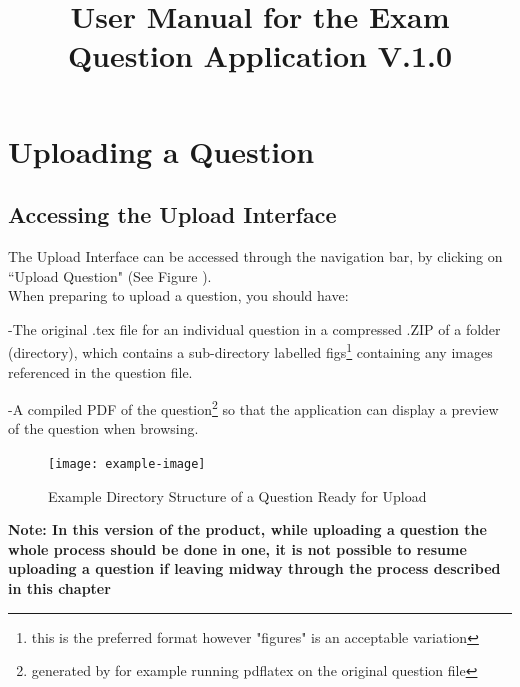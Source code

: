 \documentclass[12pt, a4paper, titlepage]{book}
\begin{document}
\begin{titlepage}

\title{User Manual for the Exam Question Application V.1.0}
\maketitle
\end{titlepage}
\tableofcontents

\chapter{Uploading a Question}
\section{Accessing the Upload Interface}
The Upload Interface can be accessed through the navigation bar, by clicking on ``Upload Question" (See Figure \label{fig:upQ}).
\\
When preparing to upload a question, you should have:\par -The original .tex file for an individual question in a compressed .ZIP of a folder (directory), which contains a sub-directory labelled figs\footnote{this is the preferred format however "figures" is an acceptable variation} containing any images referenced in the question file. \par -A compiled PDF of the question\footnote{generated by for example running pdflatex on the original question file} so that the application can display a preview of the question when browsing.
\\ \begin{figure}[htp]
\centering
\texttt{[image: example-image]}
\caption{Example Directory Structure of a Question Ready for Upload}
\end{figure}

\textbf{Note: In this version of the product, while uploading a question the whole process should be done in one, it is not possible to resume uploading a question if leaving midway through the process described in this chapter}
\pagebreak
\end{document}
